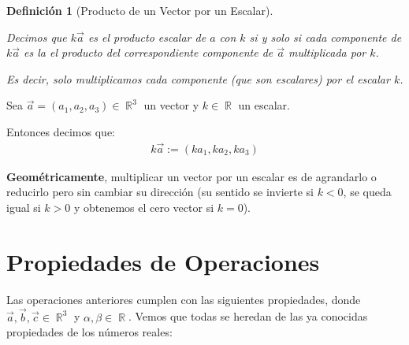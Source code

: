 \documentclass[12pt, fleqn]{report}                             %
\newtheorem{Definition}{Definición}[section]                    %
\theoremstyle{break}                                            %
\DeclareMathOperator \Reals        {\mathbb{R}}                 %
\begin{document}
                \begin{Definition}[Producto de un Vector por un Escalar]
                    \label{DefProductoVectorEscalar}

                    Decimos que $k \vec{a}$ es el producto escalar de $a$ con $k$
                    si y solo si cada componente de $k \vec{a}$ es la el producto del correspondiente componente
                    de $\vec{a}$ multiplicada por $k$.

                    Es decir, solo multiplicamos cada componente (que son escalares) por el escalar $k$.

                \end{Definition}

                Sea $\vec{a}=(a_1, a_2, a_3) \in \Reals^3$ un vector y $k \in \Reals$ un escalar.
                
                Entonces decimos que:
                \begin{align}
                    k\vec{a} := (ka_1, ka_2, ka_3)
                \end{align}

                \textbf{Geométricamente}, multiplicar un vector por un escalar es de agrandarlo o reducirlo pero
                sin cambiar su dirección (su sentido se invierte si $k < 0$, se queda igual si $k > 0$ y
                obtenemos el cero vector si $k = 0$).


  

        \clearpage
        \section{Propiedades de Operaciones}
        
            Las operaciones anteriores cumplen con las siguientes propiedades, donde
            $\vec{a},\vec{b}, \vec{c} \in \Reals^3$ y $\alpha, \beta \in \Reals$.
            Vemos que todas se heredan de las ya conocidas propiedades de los números reales:
\end{document}
